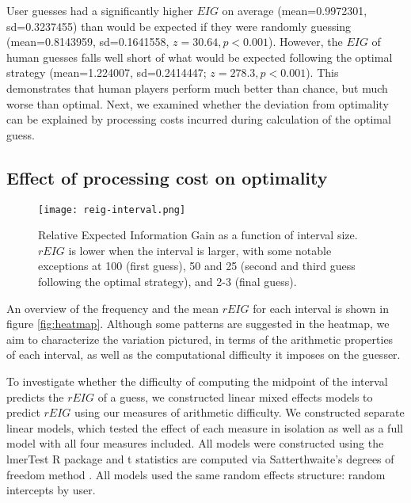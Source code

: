 \documentclass[10pt,letterpaper]{article}
\begin{document}
User guesses had a significantly higher $EIG$ on average (mean=\num{0.9972301}, sd=\num{0.3237455}) than would be expected if they were randomly guessing (mean=\num{0.8143959}, sd=\num{0.1641558}, $z = 30.64, p<0.001$). However, the $EIG$ of human guesses falls well short of what would be expected following the optimal strategy (mean=\num{1.224007}, sd=\num{0.2414447}; $z = 278.3, p<0.001$).
This demonstrates that human players perform much better than chance, but much worse than optimal. Next, we examined whether the deviation from optimality can be explained by processing costs incurred during calculation of the optimal guess.

\subsection{Effect of processing cost on optimality}

\begin{figure}[h]
    \begin{center}
    \texttt{[image: reig-interval.png]}
    \end{center}
    \vspace{-6mm}
    \caption{Relative Expected Information Gain as a function of interval size. $rEIG$ is lower when the interval is larger, with some notable exceptions at 100 (first guess), 50 and 25 (second and third guess following the optimal strategy), and 2-3 (final guess). 
}
    \label{fig:reig-interval}
    \vspace{-4mm}
\end{figure}


An overview of the frequency and the mean $rEIG$ for each interval is shown in figure \ref{fig:heatmap}. Although some patterns are suggested in the heatmap, we aim to characterize the variation pictured, in terms of the arithmetic properties of each interval, as well as the computational difficulty it imposes on the guesser.

To investigate whether the difficulty of computing the midpoint of the interval predicts the $rEIG$ of a guess, we constructed linear mixed effects models to predict $rEIG$ using our measures of arithmetic difficulty. We constructed separate linear models, which tested the effect of each measure in isolation as well as a full model with all four measures included. All models were constructed using the lmerTest R package \cite{LukeEvaluatingsignificancelinear2017} and t statistics are computed via Satterthwaite's degrees of freedom method \cite{SatterthwaiteApproximateDistributionEstimates1946,LukeEvaluatingsignificancelinear2017}. All models used the same random effects structure: random intercepts by user.
\end{document}
